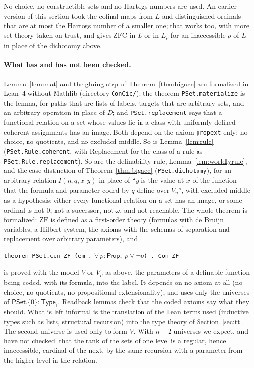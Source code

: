 \documentclass[10pt]{article}
\newcommand{\Prop}{\mathsf{Prop}}
\newcommand{\Type}{\mathsf{Type}}
\newcommand{\ZF}{\mathrm{ZF}}
\newcommand{\ZFC}{\mathrm{ZFC}}
\begin{document}
No choice, no constructible sets and no Hartogs numbers are used. An
earlier version of this section took the cofinal maps from $L$ and
distinguished ordinals that are at most the Hartogs number of a smaller
one; that works too, with more set theory taken on trust, and gives
$\ZFC$ in $L$ or in $L_\rho$ for an inaccessible $\rho$ of $L$ in place of the
dichotomy above.

\paragraph{What has and has not been checked.}
Lemma~\ref{lem:mat} and the gluing step of Theorem~\ref{thm:bigacc} are
formalized in Lean~4 without Mathlib (directory \texttt{ConCic/}): the
theorem \texttt{PSet.materialize} is the lemma, for paths that are lists
of labels, targets that are arbitrary sets, and an arbitrary operation
in place of $D$; and \texttt{PSet.replacement} says that a functional
relation on a set whose values lie in a class with uniformly defined
coherent assignments has an image. Both depend on the axiom
\texttt{propext} only: no choice, no quotients, and no excluded middle.
So is Lemma~\ref{lem:rule} (\texttt{PSet.Rule.coherent}, with Replacement
for the class of a rule as \texttt{PSet.Rule.replacement}). So are the
definability rule, Lemma~\ref{lem:worldlyrule}, and the case distinction
of Theorem~\ref{thm:bigacc} (\texttt{PSet.dichotomy}), for an arbitrary
relation $I(\eta,q,x,y)$ in place of ``$y$ is the value at $x$ of the
function that the formula and parameter coded by $q$ define over
$V_\eta$'', with excluded middle as a hypothesis: either every
functional relation on a set has an image, or some ordinal is not $0$,
not a successor, not $\omega$, and not reachable. The whole theorem is
formalized: $\ZF$ is defined as a first-order theory (formulas with de
Bruijn variables, a Hilbert system, the axioms with the schemas of
separation and replacement over arbitrary parameters), and
\begin{center}
\texttt{theorem PSet.con\_ZF (em :} $\forall\,p:\Prop,\ p\vee\neg p$\texttt{) : Con ZF}
\end{center}
is proved with the model $V$ or $V_\rho$ as above, the parameters of a
definable function being coded, with its formula, into the label. It
depends on no axiom at all (no choice, no quotients, no propositional
extensionality), and uses only the universes of $\mathsf{PSet}.\{0\}:\Type_1$.
Readback lemmas check that the coded axioms say what they should. What
is left informal is the translation of the Lean terms used (inductive
types such as lists, structural recursion) into the type theory of
Section~\ref{sec:tt}. The second
universe is used only to form $V$. With $n+2$ universes we expect, and have
not checked, that the rank of the sets of one level is a regular, hence
inaccessible, cardinal of the next, by the same recursion with a
parameter from the higher level in the relation.
\end{document}
